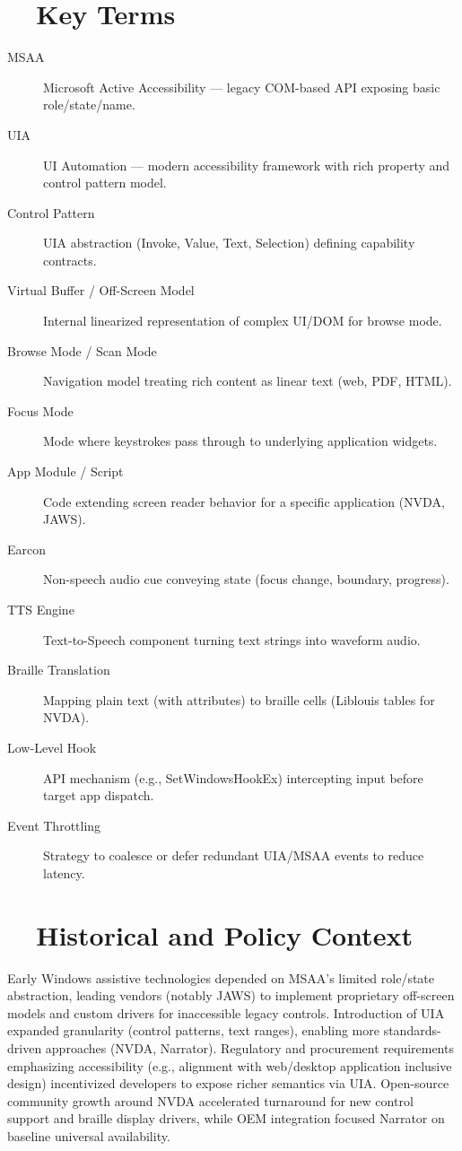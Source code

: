 \section{~~Key Terms}
\label{sec:sr-key-terms}
\begin{description}
	\item[MSAA] Microsoft Active Accessibility — legacy COM-based API exposing basic role/state/name.
	\item[UIA] UI Automation — modern accessibility framework with rich property and control pattern model.
	\item[Control Pattern] UIA abstraction (Invoke, Value, Text, Selection) defining capability contracts.
	\item[Virtual Buffer / Off-Screen Model] Internal linearized representation of complex UI/DOM for browse mode.
	\item[Browse Mode / Scan Mode] Navigation model treating rich content as linear text (web, PDF, HTML).
	\item[Focus Mode] Mode where keystrokes pass through to underlying application widgets.
	\item[App Module / Script] Code extending screen reader behavior for a specific application (NVDA, JAWS).
	\item[Earcon] Non-speech audio cue conveying state (focus change, boundary, progress).
	\item[TTS Engine] Text-to-Speech component turning text strings into waveform audio.
	\item[Braille Translation] Mapping plain text (with attributes) to braille cells (Liblouis tables for NVDA).
	\item[Low-Level Hook] API mechanism (e.g., SetWindowsHookEx) intercepting input before target app dispatch.
	\item[Event Throttling] Strategy to coalesce or defer redundant UIA/MSAA events to reduce latency.
\end{description}

\section{~~Historical and Policy Context}
\label{sec:sr-history}
Early Windows assistive technologies depended on MSAA’s limited role/state abstraction, leading vendors (notably JAWS) to implement proprietary off-screen models and custom drivers for inaccessible legacy controls. Introduction of UIA expanded granularity (control patterns, text ranges), enabling more standards-driven approaches (NVDA, Narrator). Regulatory and procurement requirements emphasizing accessibility (e.g., alignment with web/desktop application inclusive design) incentivized developers to expose richer semantics via UIA. Open-source community growth around NVDA accelerated turnaround for new control support and braille display drivers, while OEM integration focused Narrator on baseline universal availability.

